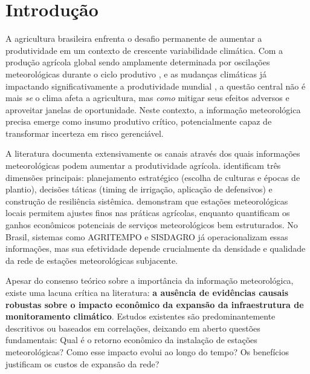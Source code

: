 \documentclass[
	12pt,				%
	oneside,			%
	a4paper,			%
	english,			%
	french,				%
	spanish,			%
	brazil				%
	]{abntex2}
\begin{document}
\chapter{Introdução}
\label{cap:introducao}

A agricultura brasileira enfrenta o desafio permanente de aumentar a produtividade em um contexto de crescente variabilidade climática. Com a produção agrícola global sendo amplamente determinada por oscilações meteorológicas durante o ciclo produtivo \cite{monteiro2009}, e as mudanças climáticas já impactando significativamente a produtividade mundial \cite{ortiz2023}, a questão central não é mais \textit{se} o clima afeta a agricultura, mas \textit{como} mitigar seus efeitos adversos e aproveitar janelas de oportunidade. Neste contexto, a informação meteorológica precisa emerge como insumo produtivo crítico, potencialmente capaz de transformar incerteza em risco gerenciável.

A literatura documenta extensivamente os canais através dos quais informações meteorológicas podem aumentar a produtividade agrícola.  identificam três dimensões principais: planejamento estratégico (escolha de culturas e épocas de plantio), decisões táticas (timing de irrigação, aplicação de defensivos) e construção de resiliência sistêmica.  demonstram que estações meteorológicas locais permitem ajustes finos nas práticas agrícolas, enquanto  quantificam os ganhos econômicos potenciais de serviços meteorológicos bem estruturados. No Brasil, sistemas como AGRITEMPO e SISDAGRO já operacionalizam essas informações, mas sua efetividade depende crucialmente da densidade e qualidade da rede de estações meteorológicas subjacente.

Apesar do consenso teórico sobre a importância da informação meteorológica, existe uma lacuna crítica na literatura: \textbf{a ausência de evidências causais robustas sobre o impacto econômico da expansão da infraestrutura de monitoramento climático}. Estudos existentes são predominantemente descritivos ou baseados em correlações, deixando em aberto questões fundamentais: Qual é o retorno econômico da instalação de estações meteorológicas? Como esse impacto evolui ao longo do tempo? Os benefícios justificam os custos de expansão da rede?
\end{document}
